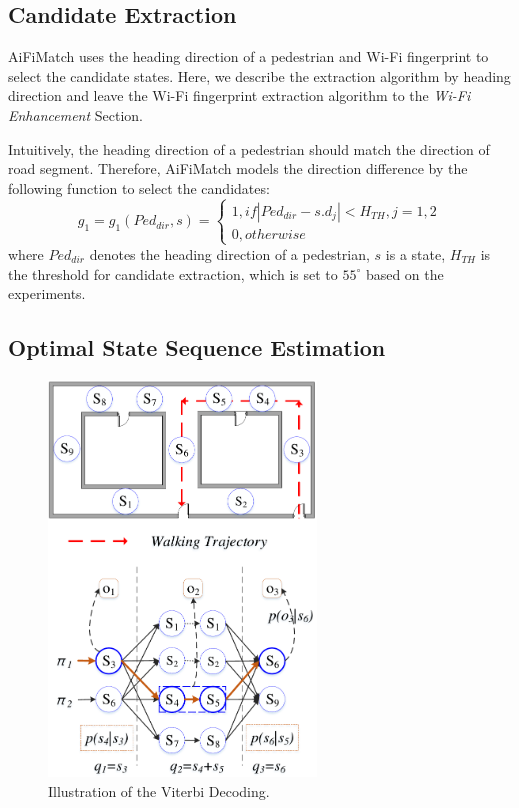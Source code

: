 \documentclass[conference]{IEEEtran}
\begin{document}
\subsection{Candidate Extraction}

AiFiMatch uses the heading direction of a pedestrian and Wi-Fi fingerprint to select the candidate states. Here, we describe the extraction algorithm by heading direction and leave the Wi-Fi fingerprint extraction algorithm to the \emph{Wi-Fi Enhancement} Section.

Intuitively, the heading direction of a pedestrian should match the direction of road segment. Therefore, AiFiMatch models the direction difference by the following function to select the candidates:
\begin{equation}
{g_1} = {g_1}({Ped_{dir}},s) = \left\{ {\begin{array}{*{20}{l}}
	{1,if\left| {{Ped_{dir}} - s.{d_j}} \right| < H_{TH},j = 1,2}\\
	{0,otherwise}
	\end{array}} \right.
\end{equation}
where $Ped_{dir}$ denotes the heading direction of a pedestrian, $s$ is a state, $H_{TH}$ is the threshold for candidate extraction, which is set to $55^\circ$ based on the experiments.

\subsection{Optimal State Sequence Estimation}

\begin{figure}[!htbp]
	\centering
	\includegraphics[width=2.8in]{AiFiMatch-Viterbi}
	\caption{Illustration of the Viterbi Decoding.}
	\label{fig-viterbi}
\end{figure}
\end{document}
